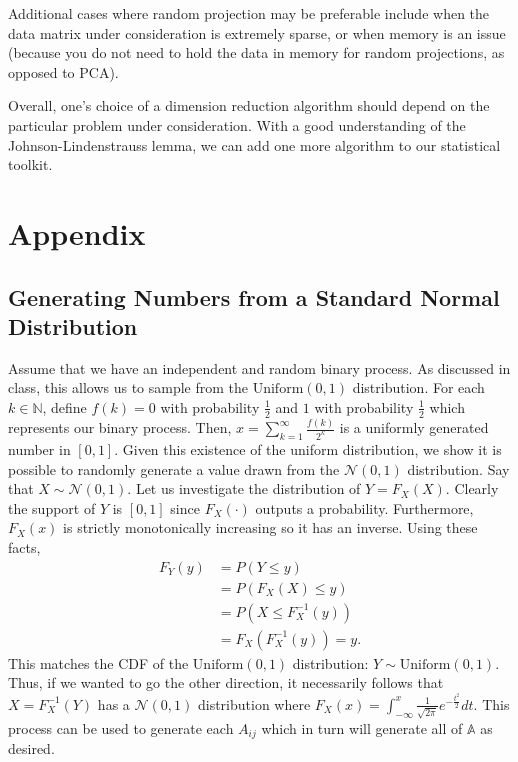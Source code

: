 \documentclass{article}
\begin{document}
Additional cases where random projection may be preferable include when the data matrix under consideration is extremely sparse, or when memory is an issue (because you do not need to hold the data in memory for random projections, as opposed to PCA).

Overall, one's choice of a dimension reduction algorithm should depend on the particular problem under consideration. With a good understanding of the Johnson-Lindenstrauss lemma, we can add one more algorithm to our statistical toolkit.

\section{Appendix}
    \subsection{Generating Numbers from a Standard Normal Distribution}\label{stdnorm}
    Assume that we have an independent and random binary process. As discussed in class, this allows us to sample from the $\text{Uniform}(0,1)$ distribution. For each $k \in \mathbb{N}$, define $f(k)=0$ with probability $\frac{1}{2}$ and $1$ with probability $\frac{1}{2}$ which represents our binary process. Then, $x = \sum_{k=1}^\infty \frac{f(k)}{2^k}$ is a uniformly generated number in $[0,1]$. Given this existence of the uniform distribution, we show it is possible to randomly generate a value drawn from the $\mathcal{N}(0,1)$ distribution. Say that $X \sim \mathcal{N}(0,1)$. Let us investigate the distribution of $Y=F_X(X).$ Clearly the support of $Y$ is $[0,1]$ since $F_X(\cdot)$ outputs a probability. Furthermore, $F_X(x)$ is strictly monotonically increasing so it has an inverse. Using these facts,
    \begin{align*}
        F_Y(y) &= P(Y \leq y) \\
        &=P(F_X(X) \leq y)\\
        &=P(X \leq F_X^{-1}(y))\\
        &=F_X(F_X^{-1}(y))=y.
    \end{align*}
    This matches the CDF of the $\text{Uniform}(0,1)$ distribution: $Y \sim \text{Uniform}(0,1)$. Thus, if we wanted to go the other direction, it necessarily follows that $X = F_X^{-1}(Y)$ has a $\mathcal{N}(0,1)$ distribution where $F_X(x) = \int_{-\infty}^x \frac{1}{\sqrt{2\pi}}e^{-\frac{t^2}{2}}dt.$ This process can be used to generate each $A_{ij}$ which in turn will generate all of $\mathbb{A}$ as desired.
    
\end{document}
